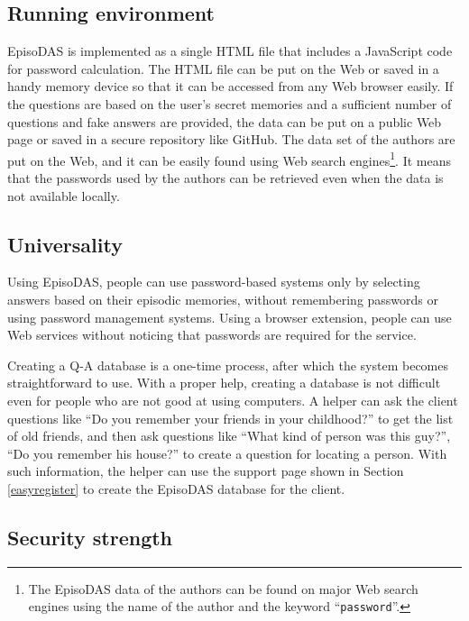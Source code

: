 \documentclass[sigconf]{acmart}
\begin{document}

\subsection{Running environment}

EpisoDAS is implemented as a single HTML file that includes a JavaScript
code for password calculation.
The HTML file can be put on the Web or saved in a handy memory device
so that it can be accessed from any Web browser easily.
%
If the questions are based on the user's secret memories and
a sufficient number of questions and fake answers are provided,
the data can be put on a public Web page or saved in a secure
repository like GitHub.
%
The data set of the authors are put on the Web, and it can be easily
found using Web search engines\footnote{
  The EpisoDAS data of the authors can be found on major Web
  search engines using the name of the author and
  the keyword ``\texttt{password}''.
}.
It means that the passwords used by the authors can be retrieved
even when the data is not available locally.

\subsection{Universality}

Using EpisoDAS, people can use password-based systems
only by selecting answers based on their episodic memories,
without remembering passwords or using password management systems.
Using a browser extension,
people can use Web services without noticing that passwords are
required for the service.

Creating a Q-A database is a one-time process,
after which the system becomes straightforward to use.
%
With a proper help, creating a database is not difficult even for
people who are not good at using computers.
A helper can ask the client questions like
``Do you remember your friends in your childhood?''
to get the list of old friends, and then ask questions like
``What kind of person was this guy?'', ``Do you remember his house?''
to create a question for locating a person.
With such information, the helper can use the support page shown
in Section \ref{easyregister} to create the EpisoDAS database
for the client.

\subsection{Security strength}
\end{document}
